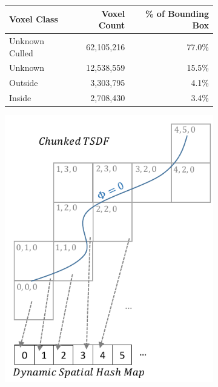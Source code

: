 \documentclass[10pt,twocolumn,letterpaper]{article}
\begin{document}
\begin{figure}
\begin{minipage} {0.25\linewidth}
\begin{subfigure}{1.0\linewidth}
		 \caption{} 
		 \label{fig:freiburg_2m}
	 \end{subfigure}  
	 \end{minipage}
    \begin{minipage}{0.45\linewidth}
		\begin{subfigure}{\linewidth} \footnotesize
		\begin{tabular} {| l | r | r |}
		\hline
		Voxel Class & Voxel Count & \% of Bounding Box \\ \hline
		Unknown Culled & 62,105,216 & 77.0\% \\ \hline
		Unknown & 12,538,559 & 15.5\% \\ \hline
		Outside & 3,303,795 & 4.1\% \\ \hline
		Inside & 2,708,430 & 3.4\% \\ \hline
		\end{tabular}
		\caption{}
		\label{table:volumecount}  
		\end{subfigure} 
 	  	\begin{subfigure}{0.45\linewidth} \centering
 	    \includegraphics[width=1.0\textwidth]{img/chunks.pdf}

\end{subfigure}
\end{minipage}
\end{figure}
\end{document}
